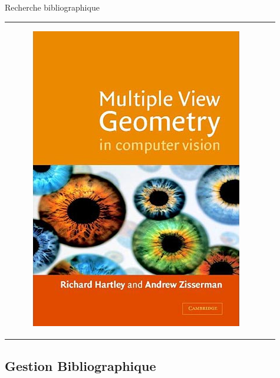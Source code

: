 \documentclass{beamer}
\begin{document}
\begin{frame}{Recherche bibliographique}
\begin{tabular}{c c}
\begin{minipage}{0.4\linewidth}
\begin{figure}
        \vspace{3mm}
        \includegraphics[width=0.5\linewidth]{images/Book.png}
      \end{figure}
    \end{minipage}
  \end{tabular}
\end{frame}


\subsection*{Gestion Bibliographique}
\end{document}
